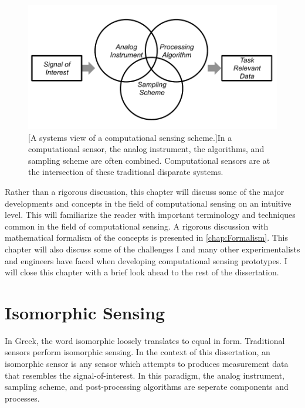 \begin{figure}
	\includegraphics[scale=1]{computationalsensingflowchart}
	[A systems view of a computational sensing scheme.]{In a computational sensor, the analog instrument, the algorithms, and sampling scheme are often combined. Computational sensors are at the intersection of these traditional disparate systems.}
	\label{fig:computationalsensingflowchart}
\end{figure}


Rather than a rigorous discussion, this chapter will discuss some of the major developments and concepts in the field of computational sensing on an intuitive level. This will familiarize the reader with important terminology and techniques common in the field of computational sensing. A rigorous discussion with mathematical formalism of the concepts is presented in \autoref{chap:Formalism}. This chapter will also discuss some of the challenges I and many other experimentalists and engineers have faced when developing computational sensing prototypes. I will close this chapter with a brief look ahead to the rest of the dissertation. 


\section{Isomorphic Sensing}\label{sec:Isomorphic Sensing}

In Greek, the word isomorphic loosely translates to equal in form. Traditional sensors perform isomorphic sensing. In the context of this dissertation, an isomorphic sensor is any sensor which attempts to produces measurement data that resembles the signal-of-interest. In this paradigm, the analog instrument, sampling scheme, and post-processing algorithms are seperate components and processes.

